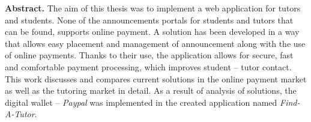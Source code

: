 \documentclass[12pt]{article}
\numberwithin{figure}{section}
\begin{document}
\begin{sloppypar}


\clearpage
{}
\setcounter{page}{2}
\setcounter{secnumdepth}{3}

\tableofcontents
\pagebreak

\textbf{Abstract.}
The aim of this thesis was to implement a web application for tutors and students.
None of the announcements portals for students and tutors that can be found, supports online payment.
A solution has been developed in a way that allows easy placement and management of announcement along with the use of online payments.
Thanks to their use, the application allows for secure, fast and comfortable payment processing, which improves student -- tutor contact.
This work discusses and compares current solutions in the online payment market as well as the tutoring market in detail.
As a result of analysis of solutions, the digital wallet -- \textit{Paypal} was implemented in the created application named \textit{Find-A-Tutor}.


\end{sloppypar}
\end{document}
